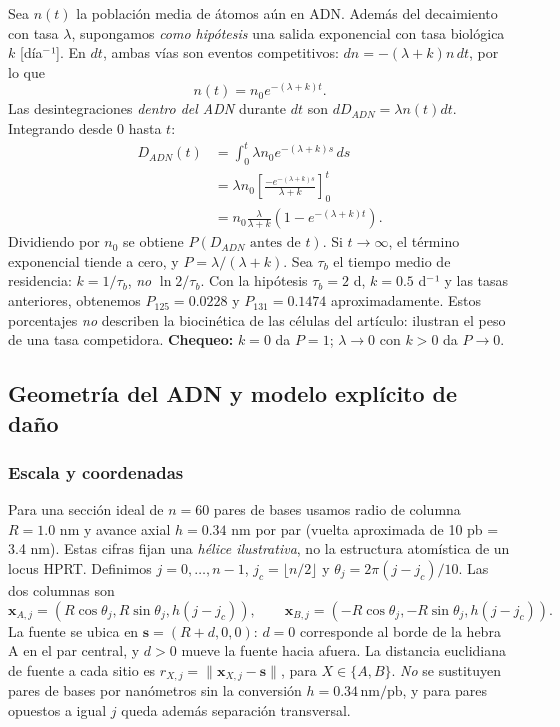 \documentclass[11pt,a4paper,oneside]{article}
\begin{document}
Sea \(n(t)\) la población media de átomos aún en ADN. Además del decaimiento con tasa \(\lambda\), supongamos \emph{como hipótesis} una salida exponencial con tasa biológica \(k\) {[}día\(^{-}\)¹{]}. En \(dt\), ambas vías son eventos competitivos: \(dn=-(\lambda+k)n\,dt\), por lo que \[n(t)=n_0e^{-(\lambda+k)t}.\] Las desintegraciones \emph{dentro del ADN} durante \(dt\) son \(dD_{ADN}=\lambda n(t)dt\). Integrando desde 0 hasta \(t\): \[\begin{aligned}
D_{ADN}(t)&=\int_0^t\lambda n_0e^{-(\lambda+k)s}\,ds\\
&=\lambda n_0\left[\frac{-e^{-(\lambda+k)s}}{\lambda+k}\right]_0^t\\
&=n_0\frac{\lambda}{\lambda+k}\left(1-e^{-(\lambda+k)t}\right).
\end{aligned}\] Dividiendo por \(n_0\) se obtiene \(P(D_{ADN}\text{ antes de }t)\). Si \(t\to\infty\), el término exponencial tiende a cero, y \(P=\lambda/(\lambda+k)\). Sea \(\tau_b\) el tiempo medio de residencia: \(k=1/\tau_b\), \emph{no} \(\ln2/\tau_b\). Con la hipótesis \(\tau_b=2\) d, \(k=0.5\) d\(^{-}\)¹ y las tasas anteriores, obtenemos \(P_{125}=0.0228\) y \(P_{131}=0.1474\) aproximadamente. Estos porcentajes \emph{no} describen la biocinética de las células del artículo: ilustran el peso de una tasa competidora. \textbf{Chequeo:} \(k=0\) da \(P=1\); \(\lambda\to0\) con \(k>0\) da \(P\to0\).

\subsection{Geometría del ADN y modelo explícito de daño}\label{geometruxeda-del-adn-y-modelo-expluxedcito-de-dauxf1o}

\subsubsection{Escala y coordenadas}\label{escala-y-coordenadas}

Para una sección ideal de \(n=60\) pares de bases usamos radio de columna \(R=1.0\) nm y avance axial \(h=0.34\) nm por par (vuelta aproximada de 10 pb = 3.4 nm). Estas cifras fijan una \emph{hélice ilustrativa}, no la estructura atomística de un locus HPRT. Definimos \(j=0,\ldots,n-1\), \(j_c=\lfloor n/2\rfloor\) y \(\theta_j=2\pi(j-j_c)/10\). Las dos columnas son \[\mathbf x_{A,j}=(R\cos\theta_j,R\sin\theta_j,h(j-j_c)),\qquad
\mathbf x_{B,j}=(-R\cos\theta_j,-R\sin\theta_j,h(j-j_c)).\] La fuente se ubica en \(\mathbf s=(R+d,0,0)\): \(d=0\) corresponde al borde de la hebra A en el par central, y \(d>0\) mueve la fuente hacia afuera. La distancia euclidiana de fuente a cada sitio es \(r_{X,j}=\|\mathbf x_{X,j}-\mathbf s\|\), para \(X\in\{A,B\}\). \emph{No} se sustituyen pares de bases por nanómetros sin la conversión \(h=0.34\,\mathrm{nm}/\mathrm{pb}\), y para pares opuestos a igual \(j\) queda además separación transversal.
\end{document}
